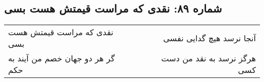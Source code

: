 \begin{center}
\section*{شماره ۸۹: نقدی که مراست قیمتش هست بسی}
\label{sec:089}
\begin{longtable}{l p{0.5cm} r}
نقدی که مراست قیمتش هست بسی
&&
آنجا نرسد هیچ گدایی نفسی
\\
گر هر دو جهان خصم من آیند به حکم
&&
هرگز نرسد به نقد من دست کسی
\\
\end{longtable}
\end{center}
